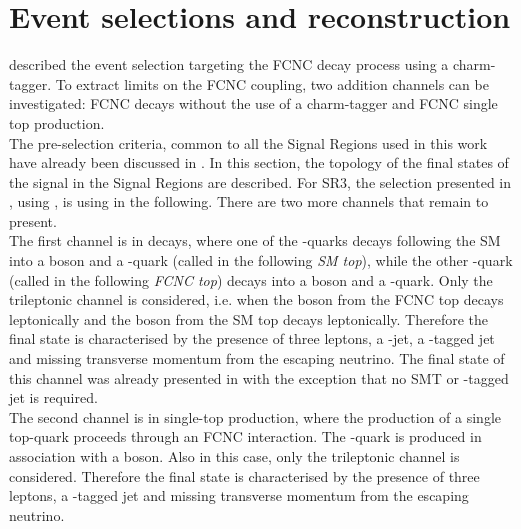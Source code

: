 \section{Event selections and reconstruction}
\label{sec:selection_all}
 described the event selection targeting the FCNC \ttbar decay process using a charm-tagger. To extract limits on the FCNC \tZc coupling, two addition channels can be investigated: FCNC \ttbar decays without the use of a charm-tagger and FCNC single top production.\\
The pre-selection criteria, common to all the Signal Regions used in this work have already been discussed in .
In this section, the topology of the final states of the signal in the Signal Regions are described. 
For SR3\tZc, the selection presented in , using \DLrc, is using in the following.
There are two more channels that remain to present.
\vspace{\baselineskip}
\\The first channel is \FCNCtZc in \ttbar decays, where one of the \Pqt-quarks decays following the SM into a \PW boson and a
\Pqb-quark (called in the following \textit{SM top}), while the other
\Pqt-quark (called in the following \textit{FCNC top}) decays into a \PZ
boson and a \Pqc-quark. Only the
trileptonic channel is considered, i.e. when the \PZ boson from the
FCNC top decays leptonically and the \PW boson from the SM top
decays leptonically. Therefore the final state is characterised by
the presence of three leptons, a \Pqc-jet, a \Pqb-tagged jet and missing
transverse momentum from the escaping neutrino.  
The final state of this channel was already presented in   with the exception that no SMT or \Pqc-tagged jet is required.
\vspace{\baselineskip}
\\The second channel is \FCNCtZc in single-top production, where the
production of a single top-quark proceeds through an FCNC
interaction. The \Pqt-quark is produced in association with a \PZ
boson. Also in this case, only the trileptonic channel is
considered. Therefore the final state is characterised by
the presence of three leptons, a \Pqb-tagged jet and missing
transverse momentum from the escaping neutrino. 

